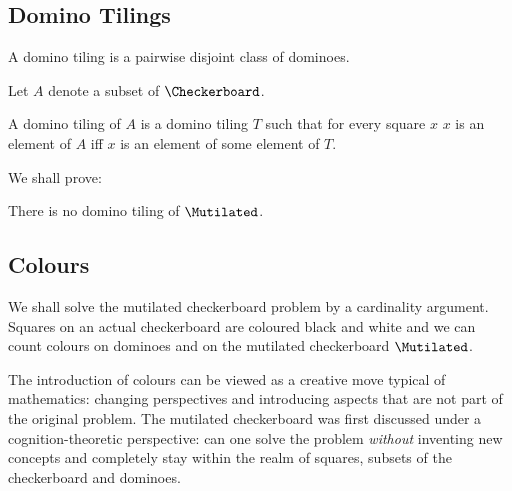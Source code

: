 \subsection{Domino Tilings}

\begin{forthel}
    \begin{definition}
        A domino tiling is a pairwise disjoint class of dominoes.
    \end{definition}

    Let $A$ denote a subset of $\Checkerboard$.

    \begin{definition}
        A domino tiling of $A$ is a domino tiling $T$
        such that for every square $x$
        $x$ is an element of $A$ iff
        $x$ is an element of some element of $T$.
    \end{definition}
\end{forthel}

We shall prove:

\begin{theorem}
    There is no domino tiling of $\Mutilated$.
\end{theorem}



\subsection{Colours}

We shall solve the mutilated checkerboard problem by a cardinality argument.
Squares on an actual checkerboard are coloured black and white and we can count
colours on dominoes and on the mutilated checkerboard $\Mutilated$.

The introduction of colours can be viewed as a creative move typical of
mathematics: changing perspectives and introducing aspects that are not part
of the original problem. The mutilated checkerboard was first discussed under
a cognition-theoretic perspective: can one solve the problem {\emph{without}}
inventing new concepts and completely stay within the realm of squares,
subsets of the checkerboard and dominoes.


